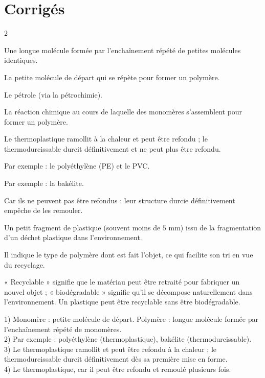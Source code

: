 \section{Corrigés}
\begin{multicols}{2}

Une longue molécule formée par l'enchaînement répété de petites molécules identiques.

La petite molécule de départ qui se répète pour former un polymère.

Le pétrole (via la pétrochimie).

La réaction chimique au cours de laquelle des monomères s'assemblent pour former un
polymère.

Le thermoplastique ramollit à la chaleur et peut être refondu ; le thermodurcissable
durcit définitivement et ne peut plus être refondu.

Par exemple : le polyéthylène (PE) et le PVC.

Par exemple : la bakélite.

Car ils ne peuvent pas être refondus : leur structure durcie définitivement empêche de
les remouler.

Un petit fragment de plastique (souvent moins de $5$ mm) issu de la fragmentation d'un
déchet plastique dans l'environnement.

Il indique le type de polymère dont est fait l'objet, ce qui facilite son tri en vue du
recyclage.

« Recyclable » signifie que le matériau peut être retraité pour fabriquer un nouvel
objet ; « biodégradable » signifie qu'il se décompose naturellement dans
l'environnement. Un plastique peut être recyclable sans être biodégradable.

1) Monomère : petite molécule de départ. Polymère : longue molécule formée par
l'enchaînement répété de monomères.\\
2) Par exemple : polyéthylène (thermoplastique), bakélite (thermodurcissable).\\
3) Le thermoplastique ramollit et peut être refondu à la chaleur ; le thermodurcissable
durcit définitivement dès sa première mise en forme.\\
4) Le thermoplastique, car il peut être refondu et remoulé plusieurs fois.


\end{multicols}
